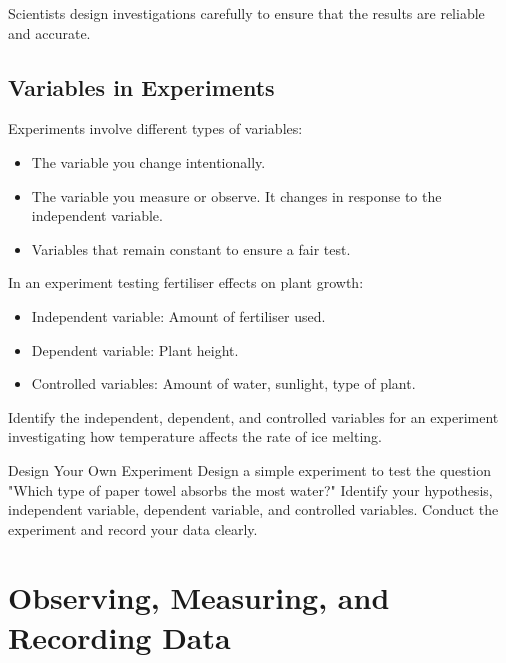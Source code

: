Scientists design investigations carefully to ensure that the results are reliable and accurate.

\subsection{Variables in Experiments}

Experiments involve different types of variables:

\begin{itemize}
    \item {} The variable you change intentionally.
    \item {} The variable you measure or observe. It changes in response to the independent variable.
    \item {} Variables that remain constant to ensure a fair test.
\end{itemize}

\begin{example}
In an experiment testing fertiliser effects on plant growth:

\begin{itemize}
    \item Independent variable: Amount of fertiliser used.
    \item Dependent variable: Plant height.
    \item Controlled variables: Amount of water, sunlight, type of plant.
\end{itemize}
\end{example}

\begin{stopandthink}
Identify the independent, dependent, and controlled variables for an experiment investigating how temperature affects the rate of ice melting.
\end{stopandthink}

\begin{investigation}{Design Your Own Experiment}
Design a simple experiment to test the question "Which type of paper towel absorbs the most water?" Identify your hypothesis, independent variable, dependent variable, and controlled variables. Conduct the experiment and record your data clearly.
\end{investigation}

\section{Observing, Measuring, and Recording Data}

